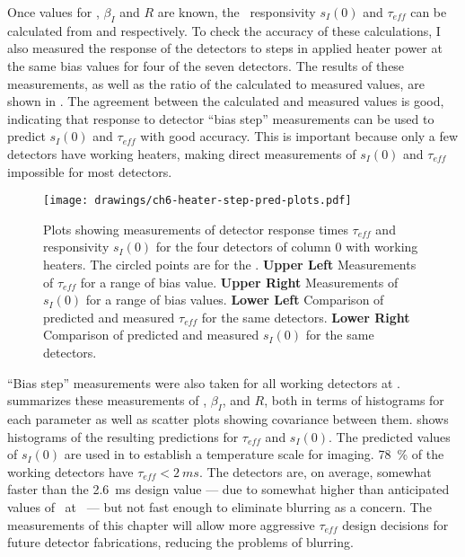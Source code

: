 Once values for \Loop, $\beta_I$ and $R$ are known, the \DC\ responsivity $s_I(0)$ and $\tau_{eff}$ can be calculated from  and  respectively.
To check the accuracy of these calculations, I also measured the response of the detectors to steps in applied heater power at the same bias values for four of the seven detectors.
The results of these measurements, as well as the ratio of the calculated to measured values, are shown in .
The agreement between the calculated and measured values is good, indicating that response to detector ``bias step'' measurements can be used to predict $s_I(0)$ and $\tau_{eff}$ with good accuracy.
This is important because only a few detectors have working heaters, making direct measurements of $s_I(0)$ and $\tau_{eff}$ impossible for most detectors.

\begin{figure*}
  \centering
\texttt{[image: drawings/ch6-heater-step-pred-plots.pdf]}
\caption[$\tau_{eff}$ and $s_I(0)$ measurements]{
  Plots showing measurements of detector response times $\tau_{eff}$ and responsivity $s_I(0)$ for the four detectors of column 0 with working heaters.
  The circled points are for the \SOC.
\textbf{Upper Left}
Measurements of $\tau_{eff}$ for a range of bias value.
\textbf{Upper Right}
Measurements of $s_I(0)$ for a range of bias values.
\textbf{Lower Left}
Comparison of predicted and measured $\tau_{eff}$ for the same detectors.
\textbf{Lower Right}
Comparison of predicted and measured $s_I(0)$ for the same detectors.
}
\label{fig:ch6-heater-step-pred-plots}
\end{figure*}

``Bias step'' measurements were also taken for all working detectors at \SOC.
 summarizes these measurements of \Loop, $\beta_I$, and $R$, both in terms of histograms for each parameter as well as scatter plots showing covariance between them.
 shows histograms of the resulting predictions for $\tau_{eff}$ and $s_I(0)$.
The predicted values of $s_I(0)$ are used in  to establish a temperature scale for imaging.
\SI{78}{\percent} of the working detectors have $\tau_{eff} < \SI{2}{ms}$.
The detectors are, on average, somewhat faster than the \SI{2.6}{\ms} design value --- due to somewhat higher than anticipated values of \Loop\ at \SOC\ --- but not fast enough to eliminate blurring as a concern.
The measurements of this chapter will allow more aggressive $\tau_{eff}$ design decisions for future detector fabrications, reducing the problems of blurring.

